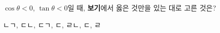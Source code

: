 $\cos\theta<0$, $\tan\theta<0$일 때, \textbf{보기}에서 옳은 것만을 있는 대로 고른 것은?  
\begin{choices32}{ㄴ}{ㄱ, ㄷ}{ㄴ, ㄷ}{ㄱ, ㄷ, ㄹ}{ㄴ, ㄷ, ㄹ}\end{choices32}
